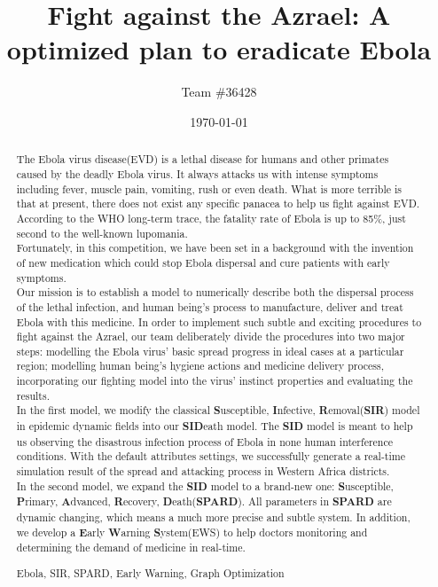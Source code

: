 \documentclass[a4paper,11pt]{article}
\title{Fight against the Azrael: A optimized plan to eradicate Ebola}
\author{Team \#36428}
\date{\today}
\begin{document}
   
\def\abstractname{Abstract}%
\begin{abstract}
  The Ebola virus disease(EVD) is a lethal disease for humans and other primates caused by the deadly Ebola virus. It always attacks us with intense symptoms including fever, muscle pain, vomiting, rush or even death. What is more terrible is that at present, there does not exist any specific panacea to help us fight against EVD. According to the WHO long-term trace, the fatality rate of Ebola is up to 85\%, just second to the well-known lupomania. \\
  Fortunately, in this competition, we have been set in a background with the invention of new medication which could stop Ebola dispersal and cure patients with early symptoms. \\
  Our mission is to establish a model to numerically describe both the dispersal process of the lethal infection, and human being's process to manufacture, deliver and treat Ebola with this medicine. In order to implement such subtle and exciting procedures to fight against the Azrael, our team deliberately divide the procedures into two major steps: modelling the Ebola virus' basic spread progress in ideal cases at a particular region; modelling human being's hygiene actions and medicine delivery process, incorporating our fighting model into the virus' instinct properties and evaluating the results.\\
  In the first model, we modify the classical \textbf{S}usceptible, \textbf{I}nfective, \textbf{R}emoval(\textbf{SIR}) model in epidemic dynamic fields into our \textbf{SID}eath model. The \textbf{SID} model is meant to help us observing the disastrous infection process of Ebola in none human interference conditions. With the default attributes settings, we successfully generate a real-time simulation result of the spread and attacking process in Western Africa districts. \\
  In the second model, we expand the \textbf{SID} model to a brand-new one:  \textbf{S}usceptible, \textbf{P}rimary, \textbf{A}dvanced, \textbf{R}ecovery, \textbf{D}eath(\textbf{SPARD}). All parameters in \textbf{SPARD} are dynamic changing, which means a much more precise and subtle system. In addition, we develop a \textbf{E}arly \textbf{W}arning \textbf{S}ystem(EWS) to help doctors monitoring and determining the demand of medicine in real-time.
\begin{keywords}
Ebola, SIR, SPARD, Early Warning, Graph Optimization 
\end{keywords}
\end{abstract}
\end{document}
